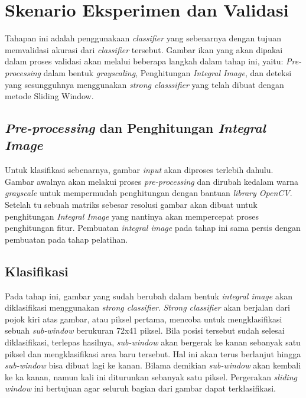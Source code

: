 \section{Skenario Eksperimen dan Validasi}

Tahapan ini adalah penggunakaan \emph{classifier} yang sebenarnya dengan tujuan 
memvalidasi akurasi dari \emph{classifier} tersebut. 
Gambar ikan yang akan dipakai dalam proses validasi akan 
melalui beberapa langkah dalam tahap ini, 
yaitu: \textit{Pre-processing} dalam bentuk \emph{grayscaling}, Penghitungan 
\emph{Integral Image}, dan deteksi yang sesungguhnya menggunakan \emph{strong classsifier} 
yang telah dibuat dengan metode Sliding Window.

\subsection{\textit{Pre-processing} dan Penghitungan \emph{Integral Image}}

Untuk klasifikasi sebenarnya, gambar \emph{input} akan diproses terlebih dahulu. 
Gambar awalnya akan melakui proses \textit{pre-processing} dan dirubah kedalam warna 
\emph{grayscale} %
untuk mempermudah penghitungan dengan bantuan \emph{library OpenCV}. 
Setelah tu sebuah matriks sebesar resolusi gambar akan dibuat untuk 
penghitungan \emph{Integral Image} yang nantinya akan mempercepat proses 
penghitungan fitur. Pembuatan \emph{integral image} pada tahap ini sama persis 
dengan pembuatan pada tahap pelatihan.

\subsection{Klasifikasi}

Pada tahap ini, gambar yang sudah berubah dalam bentuk 
\emph{integral image} akan diklasifikasi menggunakan 
\emph{strong classifier}. \emph{Strong classifier} akan berjalan dari 
pojok kiri atas gambar, atau piksel pertama, mencoba untuk mengklasifikasi 
sebuah \emph{sub-window} berukuran 72x41 piksel. Bila posisi tersebut sudah 
selesai diklasifikasi, terlepas hasilnya, \emph{sub-window} akan 
bergerak ke kanan sebanyak satu piksel dan mengklasifikasi area baru tersebut. 
Hal ini akan terus berlanjut hingga \emph{sub-window} bisa dibuat lagi ke kanan. 
Bilama demikian \emph{sub-window} akan kembali ke ka kanan, namun kali ini 
diturunkan sebanyak satu piksel. Pergerakan \emph{sliding window} ini 
bertujuan agar seluruh bagian dari gambar dapat terklasifikasi.

